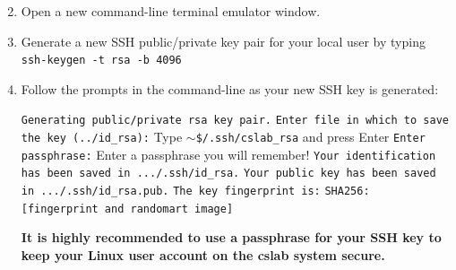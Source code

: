 \documentclass[12pt]{article}
\begin{document}
\begin{enumerate}
  \setcounter{enumi}{1}
  \item Open a new command-line terminal emulator window.
  \item Generate a new SSH public/private key pair for your local user by typing \break
  \texttt{ssh-keygen -t rsa -b 4096}

  \item Follow the prompts in the command-line as your new SSH key is generated:
  
      \texttt{Generating public/private rsa key pair.} \break
      \texttt{Enter file in which to save the key (../id\_rsa):} Type \texttt{$\sim$\$/.ssh/cslab\_rsa} and press Enter \break
      \texttt{Enter passphrase:} Enter a passphrase you will remember! \break
      \texttt{Your identification has been saved in .../.ssh/id\_rsa.} \break
      \texttt{Your public key has been saved in .../.ssh/id\_rsa.pub.} \break
      \texttt{The key fingerprint is:} \break
      \texttt{SHA256: [fingerprint and randomart image]}
      
      \textbf{It is highly recommended to use a passphrase for your SSH key to keep your Linux user account on the cslab system secure.}
 

\end{enumerate}
\end{document}

